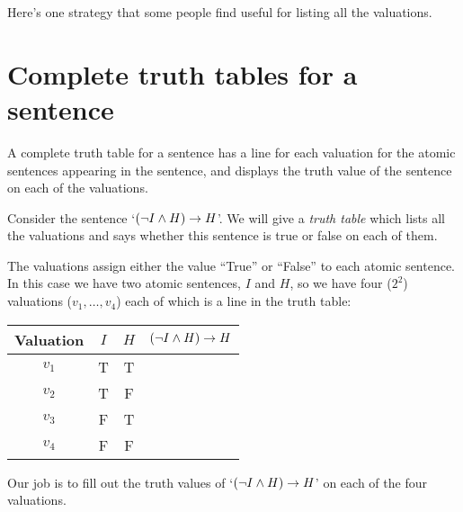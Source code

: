 Here's one strategy that some people find useful for listing all the valuations. 
	
\section{Complete truth tables for a sentence}

A complete truth table for a sentence has a line for each valuation for the atomic sentences appearing in the sentence, and displays the truth value of the sentence on each of the valuations. 


Consider the sentence `$(\neg I\mathbin{\wedge} H)\rightarrow H$'. We will give a \emph{truth table} which lists all the valuations and says whether this sentence is true or false on each of them.

The valuations assign either the value ``True'' or ``False'' to each atomic sentence. In this case we have two atomic sentences, $I$ and $H$, so we have four ($2^2$) valuations ($v_1,\dots,v_4$) each of which is a line in the truth table:
\begin{center}
	\begin{tabular}{ccc|c}
		Valuation&$I$&$H$&$(\neg I\mathbin{\wedge} H)\rightarrow H$\\\hline
		$v_1$&T&T&\\
		$v_2$&T&F&\\
		$v_3$&F&T&\\
		$v_4$&F&F&
	\end{tabular}
\end{center}
Our job is to fill out the truth values of `$(\neg I\mathbin{\wedge} H)\rightarrow H$' on each of the four valuations.

